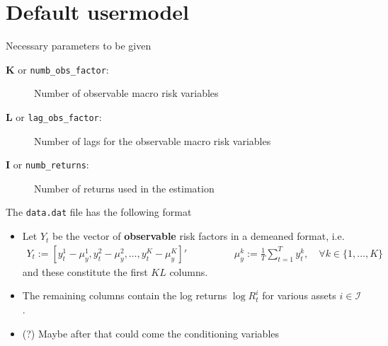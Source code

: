 \documentclass[11pt, letterpaper, notitlepage]{article}
\begin{document}
\begin{enumerate}
\begin{itemize}
\end{itemize}

\end{enumerate} 



\pagebreak


\section*{Default usermodel}

Necessary parameters to be given 
\begin{description}
\item[$\mathbf{K}$ or \texttt{numb\_obs\_factor}:] Number of observable macro risk variables
\item[$\mathbf{L}$ or \texttt{lag\_obs\_factor}:] Number of lags for the observable macro risk variables
\item[$\mathbf{I}$ or \texttt{numb\_returns}:] Number of returns used in the estimation
\end{description}



The \texttt{data.dat} file has the following format
\begin{itemize}
\item Let $Y_t$ be the vector of \textbf{observable} risk factors in a demeaned format, i.e.
\begin{align*}
Y_t := \left[ y_t^1 - \mu^1_y, y_t^2 - \mu^2_y, \dots, y_t^K - \mu^K_y \right]'\hspace{2cm} \mu_y^k := \frac{1}{T}\sum_{t=1}^{T} y^k_t,\quad \forall k\in\{1, \dots, K\}
\end{align*} 
and these constitute the first $KL$ columns.
\item The remaining columns contain the log returns $\log R^i_t$ for various assets $i\in \mathcal{I}$.
\item (?) Maybe after that could come the conditioning variables
\end{itemize}
\end{document}
